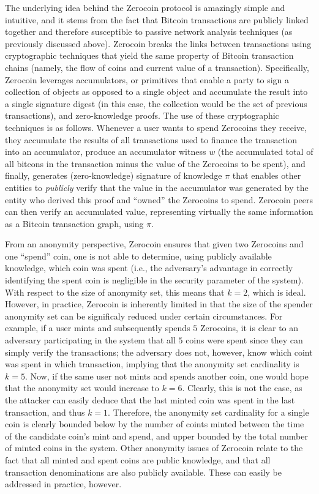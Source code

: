 The underlying idea behind the Zerocoin protocol is amazingly simple and intuitive, and it stems from the fact that Bitcoin transactions are publicly linked together and therefore susceptible to passive network analysis techniques (as previously discussed above). Zerocoin breaks the links between transactions using cryptographic techniques that yield the same property of Bitcoin transaction chains (namely, the flow of coins and current value of a transaction). Specifically, Zerocoin leverages accumulators, or primitives that enable a party to sign a collection of objects as opposed to a single object and accumulate the result into a single signature digest (in this case, the collection would be the set of previous transactions), and zero-knowledge proofs. The use of these cryptographic techniques is as follows. Whenever a user wants to spend Zerocoins they receive, they accumulate the results of all transactions used to finance the transaction into an accumulator, produce an accumulator witness $w$ (the accumulated total of all bitcons in the transaction minus the value of the Zerocoins to be spent), and finally, generates (zero-knowledge) signature of knowledge $\pi$ that enables other entities to \emph{publicly} verify that the value in the accumulator was generated by the entity who derived this proof and ``owned'' the Zerocoins to spend. Zerocoin peers can then verify an accumulated value, representing virtually the same information as a Bitcoin transaction graph, using $\pi$.

From an anonymity perspective, Zerocoin ensures that given two Zerocoins and one ``spend'' coin, one is not able to determine, using publicly available knowledge, which coin was spent (i.e., the adversary's advantage in correctly identifying the spent coin is negligible in the security parameter of the system). With respect to the size of anonymity set, this means that $k = 2$, which is ideal. However, in practice, Zerocoin is inherently limited in that the size of the spender anonymity set can be significaly reduced under certain circumstances. For example, if a user mints and subsequently spends $5$ Zerocoins, it is clear to an adversary participating in the system that all $5$ coins were spent since they can simply verify the transactions; the adversary does not, however, know which coint was spent in which transaction, implying that the anonymity set cardinality is $k = 5$. Now, if the same user not mints and spends another coin, one would hope that the anonymity set would increase to $k = 6$. Clearly, this is not the case, as the attacker can easily deduce that the last minted coin was spent in the last transaction, and thus $k = 1$. Therefore, the anonymity set cardinality for a single coin is clearly bounded below by the number of coints minted between the time of the candidate coin's mint and spend, and upper bounded by the total number of minted coins in the system. Other anonymity issues of Zerocoin relate to the fact that all minted and spent coins are public knowledge, and that all transaction denominations are also publicly available. These can easily be addressed in practice, however.

